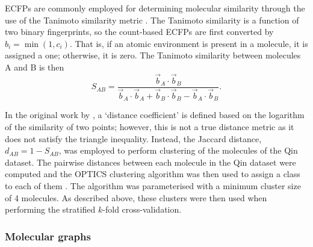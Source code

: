 ECFPs are commonly employed for determining molecular similarity through the use
of the Tanimoto similarity metric
\cite{tanimotoElementaryMathematicalTheory1958,bajuszWhyTanimotoIndex2015,butinaUnsupervisedDataBase1999}.
The Tanimoto similarity is a function of two binary fingerprints, so the
count-based ECFPs are first converted by $b_i = \min (1, c_i)$. That is, if an
atomic environment is present in a molecule, it is assigned a one; otherwise, it
is zero. The Tanimoto similarity between molecules A and B is then
\begin{equation}
    S_{AB} = \frac{\vec{b}_A \cdot \vec{b}_B}{\vec{b}_A \cdot \vec{b}_A + \vec{b}_B \cdot \vec{b}_B - \vec{b}_A \cdot \vec{b}_B}.
\end{equation}

In the original work by \citeauthor{tanimotoElementaryMathematicalTheory1958}, a
`distance coefficient' is defined based on the logarithm of the similarity of
two points; however, this is not a true distance metric as it does not satisfy
the triangle inequality. Instead, the Jaccard distance, $d_{AB} = 1 - S_{AB}$,
was employed to perform clustering of the molecules of the Qin dataset. The
pairwise distances between each molecule in the Qin dataset were computed and
the OPTICS clustering algorithm was then used to assign a class to each of them
\cite{ankerstOPTICSOrderingPoints1999}. The algorithm was parameterised with a
minimum cluster size of 4 molecules. As described above, these clusters were
then used when performing the stratified $k$-fold cross-validation.

\subsubsection{Molecular graphs}


